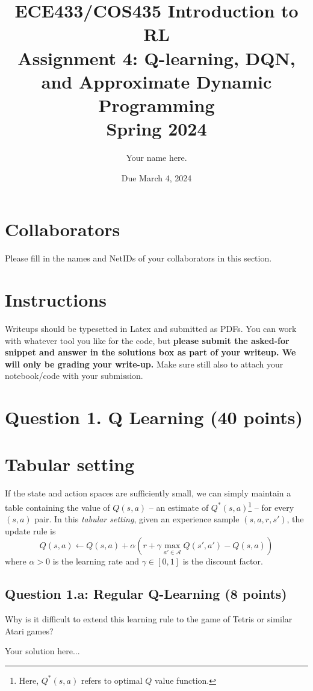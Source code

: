 \documentclass[12pt]{article}
\date{Due March 4, 2024}
\author{\begin{fillme}[width=0.3\textwidth]
 Your name here.
\end{fillme}} %
\title{ECE433/COS435 Introduction to RL\\
  Assignment 4: Q-learning, DQN, and Approximate Dynamic Programming
\\
  Spring 2024\\
}
\begin{document}
  \maketitle
  \section*{Collaborators}
\begin{fillme}
 Please fill in the names and NetIDs of your collaborators in this section.
\end{fillme}

\section*{Instructions}

Writeups should be typesetted in Latex and submitted as PDFs. You can work with whatever tool you like for the code, but \textbf{please submit the asked-for snippet and answer in the solutions box as part of your writeup. We will only be grading your write-up.} Make sure still also to attach your notebook/code with your submission.

\section*{Question 1. Q Learning (40 points)}
\section*{Tabular setting}
If the state and action spaces are sufficiently small, we can simply maintain a table containing the value of $Q(s,a)$ -- an estimate of $Q^*(s,a)$\footnote{Here, $Q^*(s,a)$ refers to optimal $Q$ value function.} -- for every $(s,a)$ pair. In this \textit{tabular setting}, given an experience sample $(s,a,r,s')$, the update rule is
\begin{equation} \label{q-learning-update}
Q(s,a) \leftarrow Q(s,a) + \alpha \left( r + \gamma \max_{a' \in \mathcal{A}} Q(s',a') - Q(s,a) \right)
\end{equation}
where $\alpha > 0$ is the learning rate and $\gamma \in [0, 1]$ is the discount factor.

\subsection*{Question 1.a: Regular Q-Learning (8 points)} Why is it difficult to extend this learning rule to the game of Tetris or similar Atari games?
\begin{solution}
Your solution here...
\end{solution}
\end{document}
